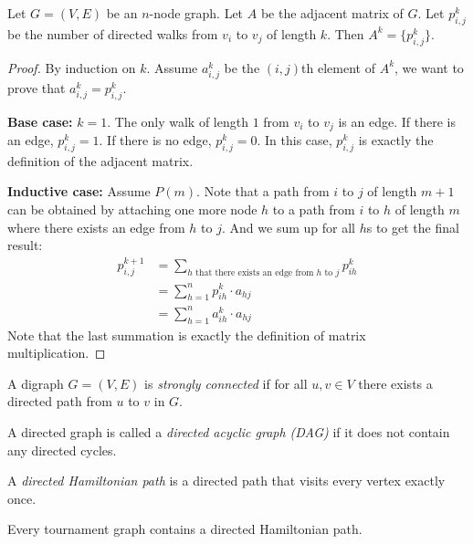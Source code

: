 \documentclass[11pt]{article}
\begin{document}
\begin{theorem}
Let $G=(V,E)$ be an $n$-node graph. Let $A$ be the adjacent matrix of $G$. Let $p_{i,j}^k$ be the
number of directed walks from $v_i$ to $v_j$ of length $k$. Then $A^k = \{p_{i,j}^k\}$.
\end{theorem}

\begin{proof}
By induction on $k$. Assume $a_{i,j}^k$ be the $(i,j)$th element of $A^k$, we want to prove that
$a_{i,j}^k=p_{i,j}^k$.

\textbf{Base case:} $k=1$. The only walk of length $1$ from $v_i$ to $v_j$ is an edge. If there is
an edge, $p_{i,j}^k=1$. If there is no edge, $p_{i,j}^k=0$. In this case, $p_{i,j}^k$ is exactly
the definition of the adjacent matrix.

\textbf{Inductive case:} Assume $P(m)$. Note that a path from $i$ to $j$ of length $m+1$ can be
obtained by attaching one more node $h$ to a path from $i$ to $h$ of length $m$ where there exists
an edge from $h$ to $j$. And we sum up for all $h$s to get the final result:
\begin{align*}
p_{i,j}^{k+1} &= \sum_{h\text{ that there exists an edge from }h\text{ to }j} p_{ih}^k \\
&= \sum_{h=1}^n p_{ih}^k \cdot a_{hj} \\
&= \sum_{h=1}^n a_{ih}^k \cdot a_{hj}
\end{align*}
Note that the last summation is exactly the definition of matrix multiplication.

\end{proof}

\begin{definition}
A digraph $G=(V,E)$ is \emph{strongly connected} if for all $u,v \in V$ there exists a directed
path from $u$ to $v$ in $G$.
\end{definition}

\begin{definition}
A directed graph is called a \emph{directed acyclic graph (DAG)} if it does not contain any
directed cycles.
\end{definition}

\begin{definition}
A \emph{directed Hamiltonian path} is a directed path that visits every vertex exactly once.
\end{definition}

\begin{theorem}
Every tournament graph contains a directed Hamiltonian path.
\end{theorem}
\end{document}
